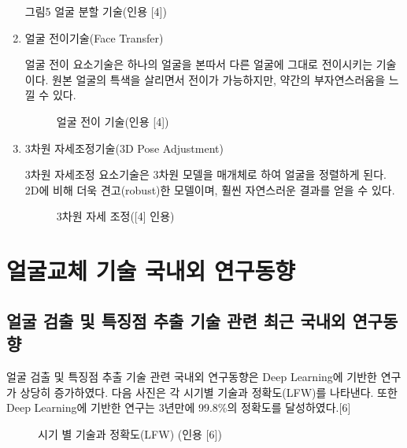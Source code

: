 \begin{enumerate}
    그림5  얼굴 분할 기술(인용 [4])

    \item 얼굴 전이기술(Face Transfer)

    얼굴 전이 요소기술은 하나의 얼굴을 본따서 다른 얼굴에 그대로 전이시키는 기술이다. 원본 얼굴의 특색을 살리면서 전이가 가능하지만, 약간의 부자연스러움을 느낄 수 있다.
    \begin{figure}[h!]
        \centering
        \caption{얼굴 전이 기술(인용 [4])}
    \end{figure}

    \item  3차원 자세조정기술(3D Pose Adjustment)

    3차원 자세조정 요소기술은 3차원 모델을 매개체로 하여 얼굴을 정렬하게 된다. 2D에 비해 더욱 견고(robust)한 모델이며, 훨씬 자연스러운 결과를 얻을 수 있다. 

    \begin{figure}[h!]
        \centering
        \caption{ 3차원 자세 조정([4] 인용)}
    \end{figure}
\end{enumerate}

\section{얼굴교체 기술 국내외 연구동향}

\subsection{얼굴 검출 및 특징점 추출 기술 관련 최근 국내외 연구동향}

얼굴 검출 및 특징점 추출 기술 관련 국내외 연구동향은 Deep Learning에 기반한 연구가 상당히 증가하였다. 다음 사진은 각 시기별 기술과 정확도(LFW)를 나타낸다. 또한 Deep Learning에 기반한 연구는 3년만에 99.8\%의 정확도를 달성하였다.[6]


\begin{figure}[h!]
\centering
\caption{ 시기 별 기술과 정확도(LFW) (인용 [6])    }
\end{figure}


